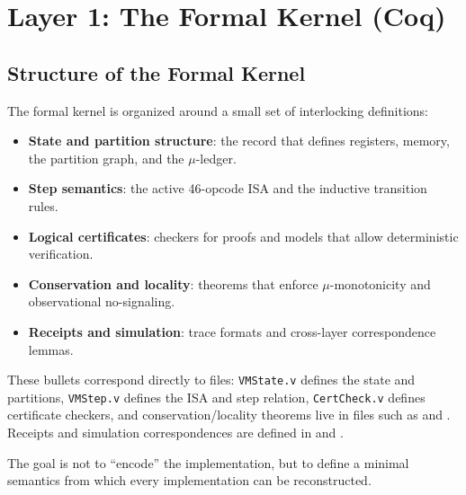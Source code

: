 \section{Layer 1: The Formal Kernel (Coq)}

\subsection{Structure of the Formal Kernel}

The formal kernel is organized around a small set of interlocking definitions:
\begin{itemize}
    \item \textbf{State and partition structure}: the record that defines registers, memory, the partition graph, and the $\mu$-ledger.
    \item \textbf{Step semantics}: the active 46-opcode ISA and the inductive transition rules.
    \item \textbf{Logical certificates}: checkers for proofs and models that allow deterministic verification.
    \item \textbf{Conservation and locality}: theorems that enforce $\mu$-monotonicity and observational no-signaling.
    \item \textbf{Receipts and simulation}: trace formats and cross-layer correspondence lemmas.
\end{itemize}
These bullets correspond directly to files: \texttt{VMState.v} defines the state and partitions, \texttt{VMStep.v} defines the ISA and step relation, \texttt{CertCheck.v} defines certificate checkers, and conservation/locality theorems live in files such as  and . Receipts and simulation correspondences are defined in  and .

The goal is not to “encode” the implementation, but to define a minimal semantics from which every implementation can be reconstructed.



